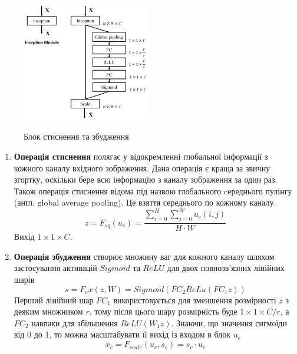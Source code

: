 \begin{figure}[H]
    \centering
    \includegraphics[width=0.5\textwidth]{images/cnn_senet_block}  \cite{squeeze_and_excitation_website}
    \caption{Блок стиснення та збудження
        \label{fig:cnn:senet_block}
    }
\end{figure}

\begin{enumerate}
    \item \textbf{Операція стиснення} полягає у відокремленні глобальної інформації з кожного каналу
          вхідного зображення. Дана операція є краща за звичну згортку, оскільки бере всю інформацію
          з каналу зображення за один раз. Також операція стиснення відома під назвою глобального
          cереднього пулінгу  (англ. global average pooling). Це взяття середнього по кожному каналу.
          \begin{equation}
              z = F_{sq}(u_c) = \frac{\sum_{i=0}^{H} \sum_{j=0}^{W} u_c(i,j)}{H·W}
          \end{equation}
          Вихід $1 \times 1 \times C$.
    \item \textbf{Операція збудження} створює множину ваг для кожного каналу шляхом застосування
          активацій $Sigmoid$ та $ReLU$ для двох повнозв'язних лінійних шарів
          \begin{equation}
              s = F_ex(z,W) = Sigmoid(FC_2ReLu(FC_1z))
          \end{equation}
          Перший лінійний шар $FC_1$ використовується для зменшення розмірності $z$ з деяким
          множником $r$, тому після цього шару розмірність буде $1 \times 1 \times C/r$, а $FC_2$ навпаки
          для збільшення $ReLU(W_1z)$. Знаючи, що значення сигмоїди від 0 до 1, то можна
          масштабувати її вихід із входом в блок $u_c$
          \begin{equation}
              \widetilde{x_c} = F_{scale}(u_c,s_c) = s_c·u_c
          \end{equation}
\end{enumerate}

